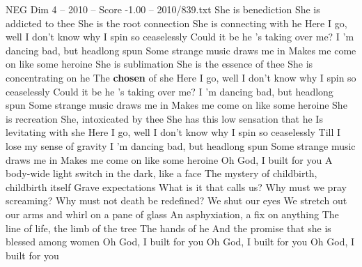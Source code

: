 \begin{textsample}{NEG Dim 4 – 2010 – Score -1.00 – 2010/839.txt}  \label{ex:f4_neg_005}
She is benediction She is addicted to thee She is the root connection She is connecting with he Here I go, well I don't know why I spin so ceaselessly Could it be he 's taking over me?
I 'm dancing bad, but headlong spun Some strange music draws me in Makes me come on like some heroine She is sublimation She is the essence of thee She is concentrating on he The \textbf{chosen} of she Here I go, well I don't know why I spin so ceaselessly Could it be he 's taking over me?
I 'm dancing bad, but headlong spun Some strange music draws me in Makes me come on like some heroine She is recreation She, intoxicated by thee She has this low sensation that he Is levitating with she Here I go, well I don't know why I spin so ceaselessly Till I lose my sense of gravity I 'm dancing bad, but headlong spun Some strange music draws me in Makes me come on like some heroine Oh God, I built for you A body-wide light switch in the dark, like a face The mystery of childbirth, childbirth itself Grave expectations What is it that calls us?
Why must we pray screaming?
Why must not death be redefined?
We shut our eyes We stretch out our arms and whirl on a pane of glass An asphyxiation, a fix on anything The line of life, the limb of the tree The hands of he And the promise that she is blessed among women Oh God, I built for you Oh God, I built for you Oh God, I built for you

\end{textsample}

